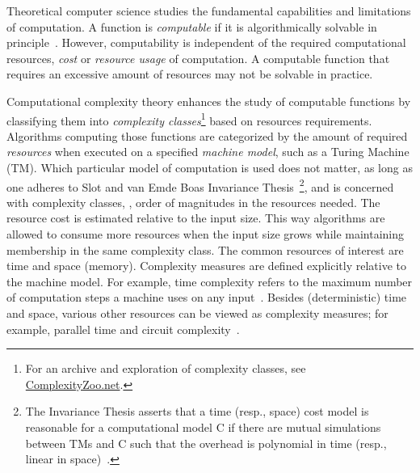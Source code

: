 Theoretical computer science studies the fundamental capabilities and limitations of computation.
A function is \emph{computable}
if it is algorithmically solvable in principle~\cite[p. 234]{sipser2012}.
However, computability is independent of the required computational resources, \ie \emph{cost} or \emph{resource usage} of computation.
A computable function that requires an excessive amount of resources may not be solvable in practice.

Computational complexity theory enhances the study of computable functions by classifying them into \emph{complexity classes}\footnote{
    For an archive and exploration of complexity classes, see \href{https://complexityzoo.net/Complexity_Zoo}{ComplexityZoo.net}.}
based on resources requirements.
Algorithms computing those functions are categorized by the amount of required \emph{resources} when executed on a specified \emph{machine model}, such as a Turing Machine (TM).
Which particular model of computation is used does not matter, as long as one adheres to Slot and van Emde Boas Invariance Thesis~\cite{slot1984}\footnote{
    The Invariance Thesis asserts that a time (resp., space) cost model is reasonable for a computational model C if there are mutual simulations between TMs and C such that the overhead is polynomial in time (resp., linear in space)~\cite{vanoni2022}.},
and is concerned with complexity classes, \ie, order of magnitudes in the resources needed.
The resource cost is estimated relative to the input size.
This way algorithms are allowed to consume more resources when the input size grows while maintaining membership in the same complexity class.
The common resources of interest are time and space (memory).
Complexity measures are defined explicitly relative to the machine model.
For example, time complexity
refers to the maximum number of computation steps a machine uses on any input~\cite[p. 276]{sipser2012}.
Besides (deterministic) time and space, various other resources can be viewed as complexity measures;
for example, parallel time and circuit complexity~\cite[p. 428]{sipser2012}.

